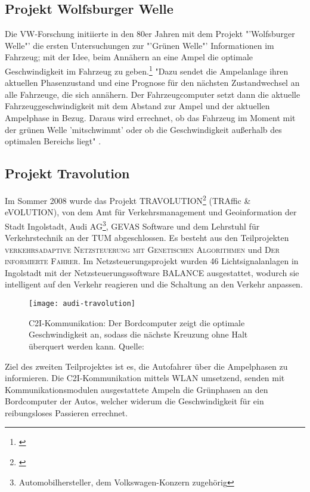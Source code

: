 \subsection{Projekt Wolfsburger Welle}
Die \gls{VW}-Forschung initiierte in den 80er Jahren mit dem Projekt "'Wolfsburger Welle"' die ersten Untersuchungen zur "'Grünen Welle"' Informationen im Fahrzeug; mit der Idee, beim Annähern an eine Ampel die optimale Geschwindigkeit im Fahrzeug zu geben.\footnote{\cite{Welle}} "Dazu sendet die Ampelanlage ihren aktuellen Phasenzustand und eine Prognose für den nächsten Zustandwechsel an alle Fahrzeuge, die sich annähern. Der Fahrzeugcomputer setzt dann die aktuelle Fahrzeuggeschwindigkeit mit dem Abstand zur Ampel und der aktuellen Ampelphase in Bezug. Daraus wird errechnet, ob das Fahrzeug im Moment mit der grünen Welle ’mitschwimmt’ oder ob die Geschwindigkeit außerhalb des optimalen Bereichs liegt" \cite{MenschMaschine}.
\subsection{Projekt Travolution}
Im Sommer 2008 wurde das Projekt TRAVOLUTION\footnote{\cite{Travolution}} (TRAffic \& eVOLUTION), von dem Amt für Verkehrsmanagement und Geoinformation der Stadt Ingolstadt, Audi AG\footnote{Automobilhersteller, dem Volkswagen-Konzern zugehörig}, GEVAS Software und dem Lehrstuhl für Verkehrstechnik an der \gls{TUM} abgeschlossen. Es besteht aus den Teilprojekten \textsc{verkehrsadaptive Netzsteuerung mit Genetischen Algorithmen} und \textsc{Der informierte Fahrer}. Im Netzsteuerungsprojekt wurden 46 Lichtsignalanlagen in Ingolstadt mit der Netzsteuerungssoftware BALANCE ausgestattet, wodurch sie intelligent auf den Verkehr reagieren und die Schaltung an den Verkehr anpassen. 
\begin{figure}[H]  
    \centering  
    \texttt{[image: audi-travolution]}
    \label{fig:travolution}
    \caption[Projekt Travolution]{\gls{C2I}-Kommunikation: Der Bordcomputer zeigt die optimale Geschwindigkeit an, sodass die nächste Kreuzung ohne Halt überquert werden kann. Quelle: \cite{AudiTravolution}}
\end{figure}
Ziel des zweiten Teilprojektes ist es, die Autofahrer über die Ampelphasen zu informieren. Die \gls{C2I}-Kommunikation mittels WLAN umsetzend, senden mit Kommunikationsmodulen ausgestattete Ampeln die Grünphasen an den Bordcomputer der Autos, welcher widerum die Geschwindigkeit für ein reibungsloses Passieren errechnet.
